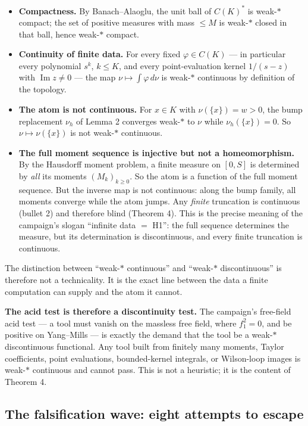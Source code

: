 \begin{itemize}
\item \textbf{Compactness.} By Banach--Alaoglu, the unit ball of $C(K)^*$ is weak-$*$ compact;
  the set of positive measures with mass $\le M$ is weak-$*$ closed in that ball, hence
  weak-$*$ compact.
\item \textbf{Continuity of finite data.} For every fixed $\varphi\in C(K)$ --- in particular
  every polynomial $s^k$, $k\le K$, and every point-evaluation kernel $1/(s-z)$ with
  $\operatorname{Im}z\ne0$ --- the map $\nu\mapsto\int\varphi\,d\nu$ is weak-$*$ continuous by
  definition of the topology.
\item \textbf{The atom is not continuous.} For $x\in K$ with $\nu(\{x\})=w>0$, the bump
  replacement $\nu_h$ of Lemma 2 converges weak-$*$ to $\nu$ while $\nu_h(\{x\})=0$. So
  $\nu\mapsto\nu(\{x\})$ is not weak-$*$ continuous.
\item \textbf{The full moment sequence is injective but not a homeomorphism.} By the Hausdorff
  moment problem, a finite measure on $[0,S]$ is determined by \emph{all} its moments
  $(M_k)_{k\ge0}$. So the atom is a function of the full moment sequence. But the inverse map is
  not continuous: along the bump family, all moments converge while the atom jumps. Any
  \emph{finite} truncation is continuous (bullet 2) and therefore blind (Theorem 4). This is the
  precise meaning of the campaign's slogan ``infinite data $=$ H1'': the full sequence determines
  the measure, but its determination is discontinuous, and every finite truncation is
  continuous.
\end{itemize}

The distinction between ``weak-$*$ continuous'' and ``weak-$*$ discontinuous'' is therefore not a
technicality. It is the exact line between the data a finite computation can supply and the atom
it cannot.

\textbf{The acid test is therefore a discontinuity test.} The campaign's free-field acid test ---
a tool must vanish on the massless free field, where $f_1^2=0$, and be positive on Yang--Mills ---
is exactly the demand that the tool be a weak-$*$ discontinuous functional. Any tool built from
finitely many moments, Taylor coefficients, point evaluations, bounded-kernel integrals, or
Wilson-loop images is weak-$*$ continuous and cannot pass. This is not a heuristic; it is the
content of Theorem 4.

\figweakstar

\subsection{The falsification wave: eight attempts to escape}

